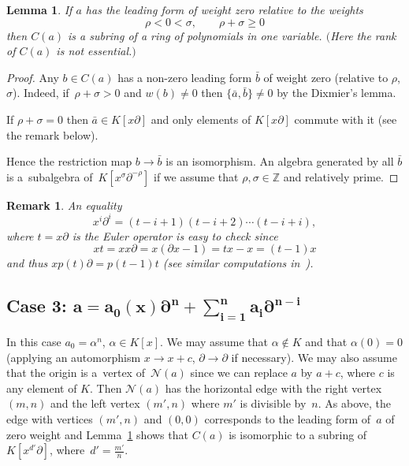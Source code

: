 \documentclass[10pt,a4paper]{amsart}
\numberwithin{equation}{section}
\newtheorem{Lemma}[Theorem]{Lemma}
\newtheorem{Remark}[Theorem]{Remark} }
\newcommand{\de}{\partial}
\newcommand{\Z}{\mathbb Z}
\newcommand{\al}{\alpha}
\begin{document}
\begin{Lemma}\label{lemma1}
If $a$ has the leading form of weight zero relative to the weights
\[
\rho < 0 < \sigma, \qquad
\rho + \sigma \geq 0
\]
then $C(a)$ is a subring of
a ring of polynomials in one variable. $($Here the rank of $C(a)$ is not essential.$)$
\end{Lemma}

\begin{proof}
Any $b \in C(a)$ has a non-zero leading form $\bar{b}$ of weight zero (relative to $\rho$, $\sigma$).
Indeed, if~$\rho + \sigma > 0$ and $w(b) \ne 0$ then $\big\{\bar{a}, \bar{b}\big\} \ne 0$ by the Dixmier's lemma.

If $\rho + \sigma = 0$ then $\bar{a} \in K[x\de]$ and only elements of $K[x\de]$
commute with it (see the remark below).

Hence the restriction map $b \rightarrow \bar{b}$ is an isomorphism. An algebra generated by all $\bar{b}$ is a~subalgebra of~$K[x^{\sigma}\de^{-\rho}]$ if we assume that $\rho, \sigma \in \Z$ and relatively prime.
\end{proof}

\begin{Remark}
 An equality
 \[
 x^i\de^i = (t-i+1)(t-i+2)\cdots(t-i+i),
 \]
 where $t = x\de$ is the Euler operator is easy to check since
 \[
 xt = xx\de = x(\de x - 1) = tx - x = (t-1)x
 \]
and thus
$xp(t)\de = p(t-1)t$ (see similar computations in~\cite{BC2}).
\end{Remark}

\subsection*{Case 3: $\boldsymbol{\displaystyle a = a_0(x)\de^n + \sum\limits_{i=1}^n a_i\de^{n-i}}$}

In this case $a_0 = \al^n$, $\al \in K[x]$. We may assume that $\al \not\in K$ and that $\al(0) = 0$ (applying an automorphism $x\rightarrow x + c$, $\de \rightarrow \de$ if necessary).
We may also assume that the origin is a~vertex of~${\mathcal N}(a)$ since we can replace $a$ by $a + c$, where $c$ is any element of $K$.
Then ${\mathcal N}(a)$ has the horizontal edge with the right vertex $(m,n)$ and the left vertex $(m',n)$ where
$m'$ is divisible by~$n$. As above, the edge with vertices $(m',n)$ and $(0,0)$ corresponds to the leading form of~$a$ of zero weight
and Lemma~\ref{lemma1} shows that $C(a)$ is isomorphic to a subring of $K[x^{d'}\de]$, where~$d' = \frac{m'}{n}$.
\end{document}
